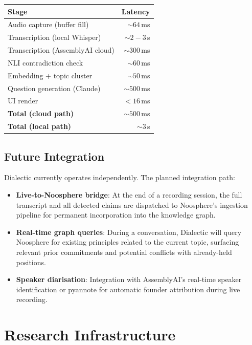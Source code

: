 \documentclass[11pt,letterpaper]{article}
\begin{document}
\begin{center}
\begin{tabular}{lr}
\toprule
\textbf{Stage} & \textbf{Latency} \\
\midrule
Audio capture (buffer fill) & ${\sim}64$\,ms \\
Transcription (local Whisper) & ${\sim}2{-}3$\,s \\
Transcription (AssemblyAI cloud) & ${\sim}300$\,ms \\
NLI contradiction check & ${\sim}60$\,ms \\
Embedding + topic cluster & ${\sim}50$\,ms \\
Question generation (Claude) & ${\sim}500$\,ms \\
UI render & $<16$\,ms \\
\midrule
\textbf{Total (cloud path)} & ${\sim}500$\,ms \\
\textbf{Total (local path)} & ${\sim}3$\,s \\
\bottomrule
\end{tabular}
\end{center}

\subsection{Future Integration}

Dialectic currently operates independently. The planned integration path:

\begin{itemize}
\item \textbf{Live-to-Noosphere bridge}: At the end of a recording session, the full transcript and all detected claims are dispatched to Noosphere's ingestion pipeline for permanent incorporation into the knowledge graph.
\item \textbf{Real-time graph queries}: During a conversation, Dialectic will query Noosphere for existing principles related to the current topic, surfacing relevant prior commitments and potential conflicts with already-held positions.
\item \textbf{Speaker diarisation}: Integration with AssemblyAI's real-time speaker identification or pyannote for automatic founder attribution during live recording.
\end{itemize}

\section{Research Infrastructure}
\end{document}
